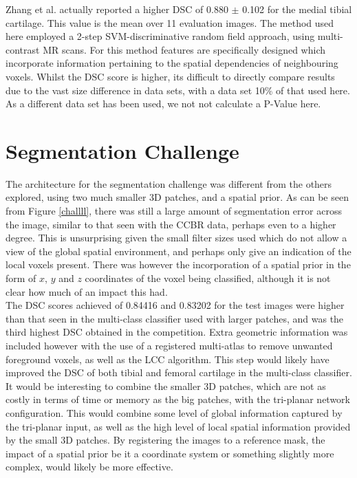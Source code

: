 \documentclass[11pt,a4paper]{memoir}
\numberwithin{figure}{section}
\numberwithin{table}{section}
\numberwithin{equation}{section}
\begin{document}
Zhang et al. \cite{Zhang} actually reported a higher DSC of 0.880 $\pm$ 0.102 for the medial tibial cartilage. This value is the mean over 11 evaluation images. The method used here employed a 2-step SVM-discriminative random field approach, using multi-contrast MR scans. For this method features are specifically designed which incorporate information pertaining to the spatial dependencies of neighbouring voxels. Whilst the DSC score is higher, its difficult to directly compare results due to the vast size difference in data sets, with a data set 10\% of that used here. As a different data set has been used, we not not calculate a P-Value here. \\

\section{Segmentation Challenge}

The architecture for the segmentation challenge was different from the others explored, using two much smaller 3D patches, and a spatial prior. As can be seen from Figure \ref{challll}, there was still a large amount of segmentation error across the image, similar to that seen with the CCBR data, perhaps even to a higher degree. This is unsurprising given the small filter sizes used which do not allow a view of the global spatial environment, and perhaps only give an indication of the local voxels present. There was however the incorporation of a spatial prior in the form of $x$, $y$ and $z$ coordinates of the voxel being classified, although it is not clear how much of an impact this had.\\

The DSC scores achieved of 0.84416 and 0.83202 for the test images were higher than that seen in the multi-class classifier used with larger patches, and was the third highest DSC obtained in the competition. Extra geometric information was included however with the use of a registered multi-atlas to remove unwanted foreground voxels, as well as the LCC algorithm. This step would likely have improved the DSC of both tibial and femoral cartilage in the multi-class classifier. \\

It would be interesting to combine the smaller 3D patches, which are not as costly in terms of time or memory as the big patches, with the tri-planar network configuration. This would combine some level of global information captured by the tri-planar input, as well as the high level of local spatial information provided by the small 3D patches. By registering the images to a reference mask, the impact of a spatial prior be it a coordinate system or something slightly more complex, would likely be more effective. 
\end{document}
